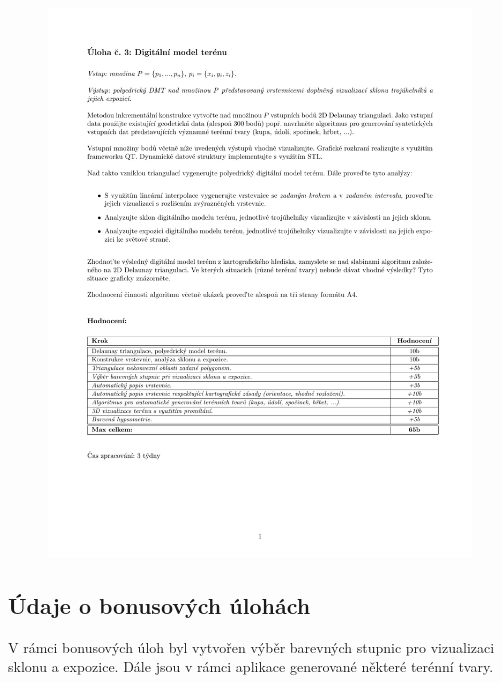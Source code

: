 \documentclass[a4paper, 12pt]{article}
\begin{document}
\begin{figure}[h!]
	\centering
	\includegraphics[width=17cm]{zadani.pdf}
\end{figure}

\subsection{Údaje o bonusových úlohách}
V rámci bonusových úloh byl vytvořen výběr barevných stupnic pro vizualizaci sklonu a expozice. Dále jsou v rámci aplikace generované některé terénní tvary.
\end{document}
